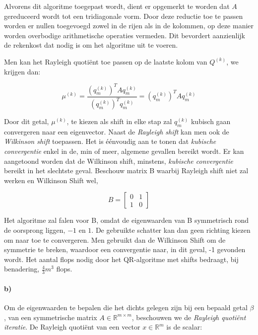 \documentclass[a4paper, 12pt, titlepage]{report}
\begin{document}
Alvorens dit algoritme toegepast wordt, dient er opgemerkt te worden dat $A$ gereduceerd wordt tot een tridiagonale vorm. Door deze reductie toe te passen worden er nullen toegevoegd zowel in de rijen als in de kolommen, op deze manier worden overbodige arithmetische operaties vermeden. Dit bevordert aanzienlijk de rekenkost dat nodig is om het algoritme uit te voeren.

Men kan het Rayleigh quoti\"ent toe passen op de laatste kolom van $Q^{(k)}$, we krijgen dan:

\begin{equation}
	\mu^{(k)} = \frac{(q^{(k)}_m)^TAq^{(k)}_m}{(q^{(k)}_m)^Tq^{(k)}_m} = (q^{(k)}_m)^TAq^{(k)}_m
	\label{eqn:rayleighquotient}
\end{equation}

Door dit getal, $\mu^{(k)}$, te kiezen als shift in elke stap zal $q^{(k)}_m$ kubisch gaan convergeren naar een eigenvector. Naast de \emph{Rayleigh shift} kan men ook de \emph{Wilkinson shift} toepassen. Het is \'e\'envoudig aan te tonen dat \emph{kubische convergentie} enkel in de, min of meer, algemene gevallen bereikt wordt. Er kan aangetoond worden dat de Wilkinson shift, minstens, \emph{kubische convergentie} bereikt in het slechtste geval. Beschouw matrix B waarbij Rayleigh shift niet zal werken en Wilkinson Shift wel,

\begin{equation}
 B = \begin{bmatrix} 0 & 1 \\ 1 & 0 \end{bmatrix}
\end{equation}

Het algoritme zal falen voor B, omdat de eigenwaarden van B symmetrisch rond de oorsprong liggen, $-1$ en $1$. De gebruikte schatter kan dan geen richting kiezen om naar toe te convergeren. Men gebruikt dan de Wilkinson Shift om de symmetrie te breken, waardoor een convergentie naar, in dit geval, -1 gevonden wordt. Het aantal flops nodig door het QR-algoritme met shifts bedraagt, bij benadering, $\frac{4}{3}m^3$ flops.

\paragraph{b)} Om de eigenwaarden te bepalen die het dichts gelegen zijn bij een bepaald getal $\beta$, van een symmetrische matrix $A\in \mathbb{R}^{m\times m}$, beschouwen we de \emph{Rayleigh quoti\"ent iteratie}. De Rayleigh quoti\"ent van een vector $x \in \mathbb{R}^m$ is de scalar:
\end{document}
